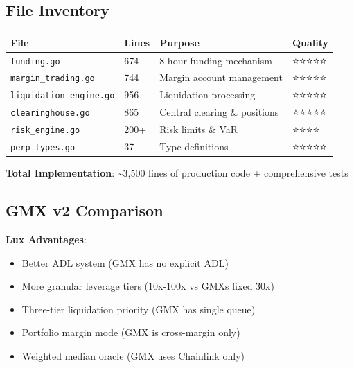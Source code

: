 \documentclass[
]{article}
\newenvironment{Shaded}{}{}
\newcommand{\BaseNTok}[1]{\textcolor[rgb]{0.25,0.63,0.44}{#1}}
\newcommand{\CommentTok}[1]{\textcolor[rgb]{0.38,0.63,0.69}{\textit{#1}}}
\newcommand{\DecValTok}[1]{\textcolor[rgb]{0.25,0.63,0.44}{#1}}
\newcommand{\FloatTok}[1]{\textcolor[rgb]{0.25,0.63,0.44}{#1}}
\newcommand{\KeywordTok}[1]{\textcolor[rgb]{0.00,0.44,0.13}{\textbf{#1}}}
\newcommand{\NormalTok}[1]{#1}
\newcommand{\OperatorTok}[1]{\textcolor[rgb]{0.40,0.40,0.40}{#1}}
\newcounter{none} %
\providecommand{\tightlist}{%
  \setlength{\itemsep}{0pt}\setlength{\parskip}{0pt}}
\begin{document}
\begin{Shaded}
\end{Shaded}

\subsection{File Inventory}\label{file-inventory}

{\def\LTcaptype{none} %
\begin{longtable}[]{@{}llll@{}}
\toprule\noalign{}
File & Lines & Purpose & Quality \\
\midrule\noalign{}
\endhead
\bottomrule\noalign{}
\endlastfoot
\texttt{funding.go} & 674 & 8-hour funding mechanism & ⭐⭐⭐⭐⭐ \\
\texttt{margin\_trading.go} & 744 & Margin account management &
⭐⭐⭐⭐⭐ \\
\texttt{liquidation\_engine.go} & 956 & Liquidation processing &
⭐⭐⭐⭐⭐ \\
\texttt{clearinghouse.go} & 865 & Central clearing \& positions &
⭐⭐⭐⭐⭐ \\
\texttt{risk\_engine.go} & 200+ & Risk limits \& VaR & ⭐⭐⭐⭐ \\
\texttt{perp\_types.go} & 37 & Type definitions & ⭐⭐⭐⭐⭐ \\
\end{longtable}
}

\textbf{Total Implementation}: \textasciitilde3,500 lines of production
code + comprehensive tests

\subsection{GMX v2 Comparison}\label{gmx-v2-comparison}

\textbf{Lux Advantages}:

\begin{itemize}
\tightlist
\item
  Better ADL system (GMX has no explicit ADL)
\item
  More granular leverage tiers (10x-100x vs GMX\textquotesingle s fixed
  30x)
\item
  Three-tier liquidation priority (GMX has single queue)
\item
  Portfolio margin mode (GMX is cross-margin only)
\item
  Weighted median oracle (GMX uses Chainlink only)
\end{itemize}
\end{document}
